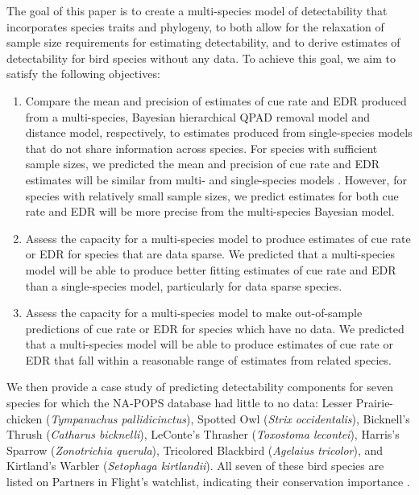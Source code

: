 \documentclass[12pt]{article}
\begin{document}
\par The goal of this paper is to create a multi-species model of detectability that incorporates species traits and phylogeny, to both allow for the relaxation of sample size requirements for estimating detectability, and to derive estimates of detectability for bird species without any data.
To achieve this goal, we aim to satisfy the following objectives:
\begin{enumerate}
	\item Compare the mean and precision of estimates of cue rate and EDR produced from a multi-species, Bayesian hierarchical QPAD removal model and distance model, respectively, to estimates produced from single-species models that do not share information across species.
	For species with sufficient sample sizes, we predicted the mean and precision of cue rate and EDR estimates will be similar from multi- and single-species models \citep{edwards_point_2023}.
	However, for species with relatively small sample sizes, we predict estimates for both cue rate and EDR will be more precise from the multi-species Bayesian model.
	\item Assess the capacity for a multi-species model to produce estimates of cue rate or EDR for species that are data sparse.
	We predicted that a multi-species model will be able to produce better fitting estimates of cue rate and EDR than a single-species model, particularly for data sparse species.
	\item Assess the capacity for a multi-species model to make out-of-sample predictions of cue rate or EDR for species which have no data.
	We predicted that a multi-species model will be able to produce estimates of cue rate or EDR that fall within a reasonable range of estimates from related species.
\end{enumerate}

We then provide a case study of predicting detectability components for seven species for which the NA-POPS database had little to no data: Lesser Prairie-chicken (\textit{Tympanuchus pallidicinctus}), Spotted Owl (\textit{Strix occidentalis}), Bicknell’s Thrush (\textit{Catharus bicknelli}), LeConte’s Thrasher (\textit{Toxostoma lecontei}), Harris’s Sparrow (\textit{Zonotrichia querula}), Tricolored Blackbird (\textit{Agelaius tricolor}), and Kirtland’s Warbler (\textit{Setophaga kirtlandii}). 	
All seven of these bird species are listed on Partners in Flight’s watchlist, indicating their conservation importance \citep{will_handbook_2020}. 	
\end{document}

